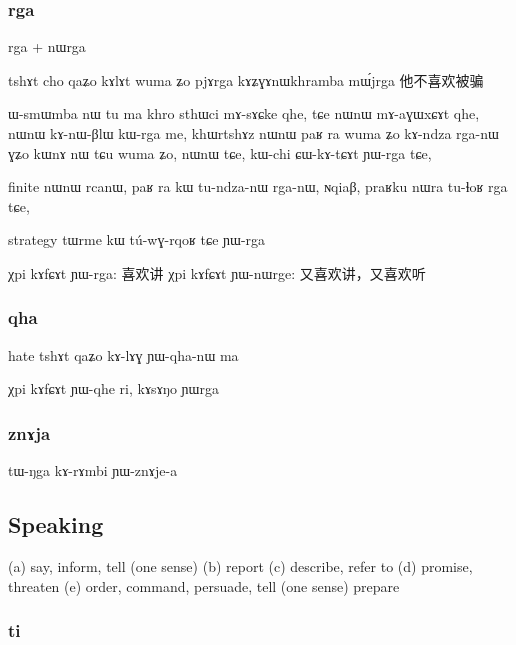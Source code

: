 \documentclass[oldfontcommands,oneside,a4paper,11pt]{article}
\begin{document}
\subsubsection{rga}
rga + nɯrga

tshɤt cho qaʑo kɤlɤt wuma ʑo pjɤrga
kɤʑɣɤnɯkhramba mɯ́jrga 他不喜欢被骗

ɯ-smɯmba nɯ tu ma khro sthɯci mɤ-sɤɕke qhe,
tɕe nɯnɯ mɤ-aɣɯxɕɤt qhe,
nɯnɯ kɤ-nɯ-βlɯ kɯ-rga me,
khɯrtshɤz nɯnɯ paʁ ra wuma ʑo kɤ-ndza rga-nɯ
ɣʑo kɯnɤ nɯ tɕu wuma ʑo, nɯnɯ tɕe, kɯ-chi ɕɯ-kɤ-tɕɤt ɲɯ-rga tɕe,

finite
nɯnɯ rcanɯ, paʁ ra kɯ tu-ndza-nɯ rga-nɯ,
ɴqiaβ, praʁku nɯra tu-ɬoʁ rga tɕe,

strategy
tɯrme kɯ tú-wɣ-rqoʁ tɕe ɲɯ-rga

χpi kɤfɕɤt ɲɯ-rga: 喜欢讲
χpi kɤfɕɤt ɲɯ-nɯrge: 又喜欢讲，又喜欢听

\subsubsection{qha}

hate
tshɤt qaʑo kɤ-lɤɣ ɲɯ-qha-nɯ ma

χpi kɤfɕɤt ɲɯ-qhe ri, kɤsɤŋo ɲɯrga
\subsubsection{znɤja}
 tɯ-ŋga kɤ-rɤmbi ɲɯ-znɤje-a



  \subsection{Speaking} 
  
  
(a) say, inform, tell (one sense)
(b) report
(c) describe, refer to
(d) promise, threaten
(e) order, command, persuade, tell (one sense)
 prepare
 
  \subsubsection{ti}
  
\end{document}
